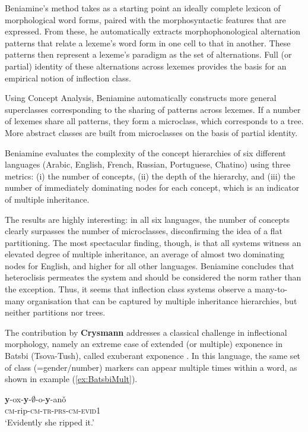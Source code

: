 \documentclass[output=paper]{langscibook}
\begin{document}
Beniamine's method takes as a starting point an ideally complete
lexicon of morphological word forms, paired with the morphosyntactic
features that are expressed. From these, he automatically extracts
morphophonological alternation patterns that relate a lexeme's  word form in
one cell to that in another. These patterns then represent a lexeme's
paradigm as the set of alternations. Full (or partial) identity of 
these alternations across lexemes provides the basis for an empirical
notion of inflection class. 

Using Concept Analysis, Beniamine automatically constructs more
general superclasses corresponding to the sharing of patterns across
lexemes. If a number of lexemes share all patterns, they form a
microclass, which corresponds to a tree. More abstract classes are
built from microclasses on the basis of partial identity.

Beniamine evaluates the complexity of the concept hierarchies of six
different languages (Arabic, English, French, Russian, Portuguese,
Chatino) using three metrics: (i) the number of concepts, (ii) the
depth of the hierarchy, and (iii) the number of immediately dominating
nodes for each concept, which is an indicator of multiple inheritance.

The results are highly interesting: in all six languages, the number
of concepts clearly surpasses the number of microclasses,
disconfirming the idea of a flat partitioning. The most spectacular
finding, though, is that all systems witness an elevated degree of
multiple inheritance, an average of almost two dominating nodes for
English, and higher for all other languages. Beniamine concludes that
heteroclisis permeates the system and should be considered the norm
rather than the exception. Thus, it seems that inflection class
systems observe a many-to-many organisation that can be captured by
multiple inheritance hierarchies, but neither partitions nor trees.



\medskip The contribution by \textbf{Crysmann} addresses a classical
challenge in inflectional morphology, namely an extreme case of
extended (or multiple) exponence in Batsbi (Tsova-Tush), called
exuberant exponence \citep{Harris09}. In this language, the same set
of class (=gender/number) markers can appear multiple times
within a word, as shown in example (\ref{ex:BatsbiMult}).

\begin{exe}
  \ex  \label{ex:BatsbiMult}\gll \textbf{y}-ox-\textbf{y}-$\emptyset$-o-\textbf{y}-anǒ\\
  \textsc{cm}-rip-\textsc{cm-tr-prs-cm-evid1}\\
  \glt `Evidently she ripped it.’ \hfill\citep[277]{Harris09}
  
\end{exe}
\end{document}
